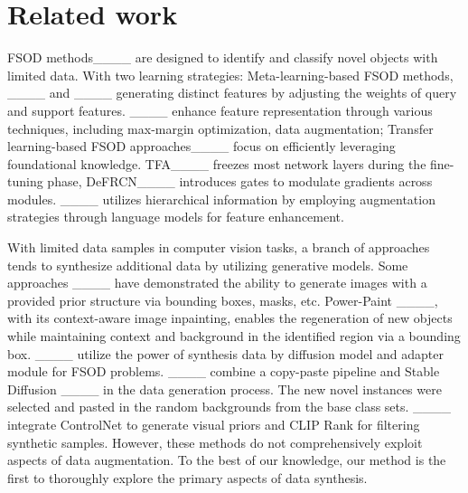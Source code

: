\section{Related work}
\label{sec:related_word}
FSOD methods____ are designed to identify and classify novel objects with limited data. With two learning strategies: Meta-learning-based FSOD methods, ____ and ____ generating distinct features by adjusting the weights of query and support features. ____ enhance feature representation through various techniques, including max-margin optimization, data augmentation; Transfer learning-based FSOD approaches____ focus on efficiently leveraging foundational knowledge. TFA____ freezes most network layers during the fine-tuning phase, DeFRCN____ introduces gates to modulate gradients across modules. ____ utilizes hierarchical information by employing augmentation strategies through language models for feature enhancement.
 

With limited data samples in computer vision tasks, a branch of approaches tends to synthesize additional data by utilizing generative models. Some approaches ____ have demonstrated the ability to generate images with a provided prior structure via bounding boxes, masks, etc. Power-Paint ____, with its context-aware image inpainting, enables the regeneration of new objects while maintaining context and background in the identified region via a bounding box. ____ utilize the power of synthesis data by diffusion model and adapter module for FSOD problems. ____ combine a copy-paste pipeline and Stable Diffusion ____ in the data generation process. The new novel instances were selected and pasted in the random backgrounds from the base class sets. ____ integrate ControlNet to generate visual priors and CLIP Rank for filtering synthetic samples. However, these methods do not comprehensively exploit aspects of data augmentation. To the best of our knowledge, our method is the first to thoroughly explore the primary aspects of data synthesis.